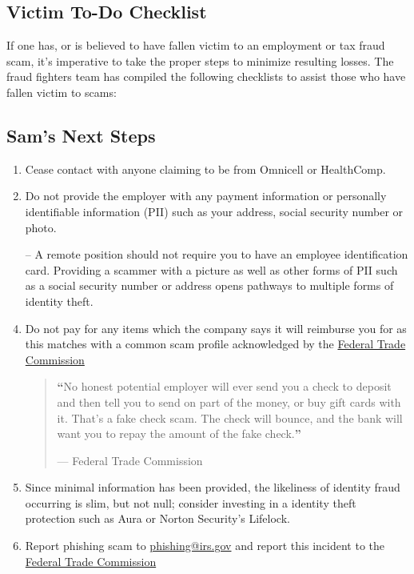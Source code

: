 \begin{fullwidth}
\section{Victim To-Do Checklist} %

If one has, or is believed to have fallen victim to an employment or tax fraud scam, it's imperative to take the proper steps to minimize resulting losses. The fraud fighters team has compiled the following checklists to assist those who have fallen victim to scams:

\subsection{Sam's Next Steps} %

\begin{enumerate}
     \item Cease contact with anyone claiming to be from Omnicell or HealthComp.
     \item Do not provide the employer with any payment information or personally identifiable information (PII) such as your address, social security number or photo.
    \item[--] A remote position should not require you to have an employee identification card. Providing a scammer with a picture as well as other forms of PII such as a social security number or address opens pathways to multiple forms of identity theft.
    \item Do not pay for any items which the company says it will reimburse you for as this matches with a common scam profile acknowledged by the \href{https://consumer.ftc.gov/articles/job-scams#what%
}{Federal Trade Commission}
    
     \begin{quote}
	\textbf{\LARGE ``}No honest potential employer will ever send you a check to deposit and then tell you to send on part of the money, or buy gift cards with it. That’s a fake check scam. The check will bounce, and the bank will want you to repay the amount of the fake check.\textbf{''}

\hfill--- Federal Trade Commission \autocite{Hebert:2024}
 
    \end{quote}

    \item Since minimal information has been provided, the likeliness of identity fraud occurring is slim, but not null; consider investing in a identity theft protection such as Aura or Norton Security's Lifelock.
    \item Report phishing scam to \href{mailto:phishing@irs.gov}{phishing@irs.gov} and report this incident to the \href{ReportFraud.ftc.gov}{Federal Trade Commission}
    

\end{enumerate}
\end{fullwidth}
